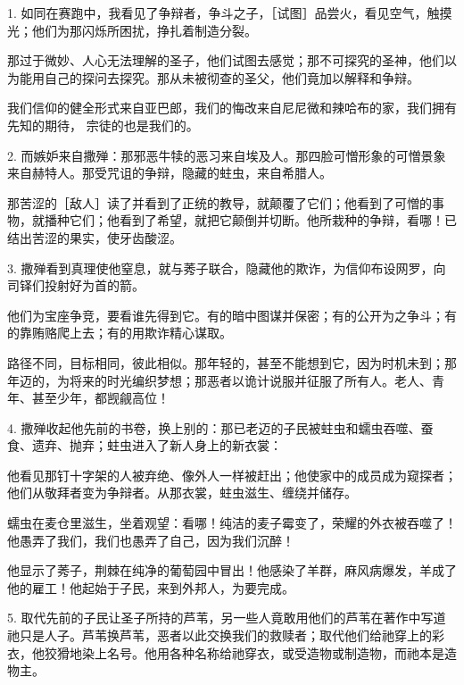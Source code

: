 1. 如同在赛跑中，我看见了争辩者，争斗之子，［试图］品尝火，看见空气，触摸光；他们为那闪烁所困扰，挣扎着制造分裂。\par

那过于微妙、人心无法理解的圣子，他们试图去感觉；那不可探究的圣神，他们以为能用自己的探问去探究。那从未被彻查的圣父，他们竟加以解释和争辩。\par

我们信仰的健全形式来自亚巴郎，我们的悔改来自尼尼微和辣哈布的家，我们拥有先知的期待， 宗徒的也是我们的。\par

2. 而嫉妒来自撒殚：那邪恶牛犊的恶习来自埃及人。那四脸可憎形象的可憎景象来自赫特人。那受咒诅的争辩，隐藏的蛀虫，来自希腊人。\par

那苦涩的［敌人］读了并看到了正统的教导，就颠覆了它们；他看到了可憎的事物，就播种它们；他看到了希望，就把它颠倒并切断。他所栽种的争辩，看哪！已结出苦涩的果实，使牙齿酸涩。\par

3. 撒殚看到真理使他窒息，就与莠子联合，隐藏他的欺诈，为信仰布设网罗，向司铎们投射好为首的箭。\par

他们为宝座争竞，要看谁先得到它。有的暗中图谋并保密；有的公开为之争斗；有的靠贿赂爬上去；有的用欺诈精心谋取。\par

路径不同，目标相同，彼此相似。那年轻的，甚至不能想到它，因为时机未到；那年迈的，为将来的时光编织梦想；那恶者以诡计说服并征服了所有人。老人、青年、甚至少年，都觊觎高位！\par

4. 撒殚收起他先前的书卷，换上别的：那已老迈的子民被蛀虫和蠕虫吞噬、蚕食、遗弃、抛弃；蛀虫进入了新人身上的新衣裳：\par

他看见那钉十字架的人被弃绝、像外人一样被赶出；他使家中的成员成为窥探者；他们从敬拜者变为争辩者。从那衣裳，蛀虫滋生、缠绕并储存。\par

蠕虫在麦仓里滋生，坐着观望：看哪！纯洁的麦子霉变了，荣耀的外衣被吞噬了！他愚弄了我们，我们也愚弄了自己，因为我们沉醉！\par

他显示了莠子，荆棘在纯净的葡萄园中冒出！他感染了羊群，麻风病爆发，羊成了他的雇工！他起始于子民，来到外邦人，为要完成。\par

5. 取代先前的子民让圣子所持的芦苇，另一些人竟敢用他们的芦苇在著作中写道祂只是人子。芦苇换芦苇，恶者以此交换我们的救赎者；取代他们给祂穿上的彩衣，他狡猾地染上名号。他用各种名称给祂穿衣，或受造物或制造物，而祂本是造物主。\par

